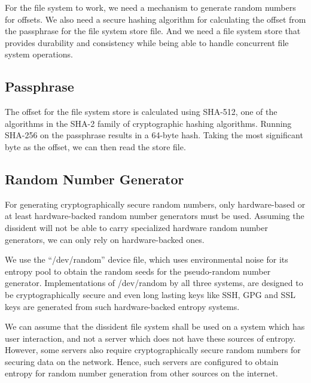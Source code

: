 \documentclass[10pt,twocolumn]{article}
\begin{document}
For the file system to work, we need a mechanism to generate random numbers for offsets. We also need a secure hashing algorithm for calculating the offset from the passphrase for the file system store file. And we need a file system store that provides durability and consistency while being able to handle concurrent file system operations.

\subsection{Passphrase}

The offset for the file system store is calculated using SHA-512, one of the algorithms in the SHA-2 family of cryptographic hashing algorithms. Running SHA-256 on the passphrase results in a 64-byte hash. Taking the most significant byte as the offset, we can then read the store file.

\subsection{Random Number Generator}

For generating cryptographically secure random numbers, only hardware-based or at least hardware-backed random number generators must be used. Assuming the dissident will not be able to carry specialized hardware random number generators, we can only rely on hardware-backed ones.

We use the ``/dev/random'' device file, which uses environmental noise for its entropy pool to obtain the random seeds for the pseudo-random number generator. Implementations of /dev/random by all three systems, are designed to be cryptographically secure and even long lasting keys like SSH, GPG and SSL keys are generated from such hardware-backed entropy systems.

We can assume that the dissident file system shall be used on a system which has user interaction, and not a server which does not have these sources of entropy. However, some servers also require cryptographically secure random numbers for securing data on the network. Hence, such servers are configured to obtain entropy for random number generation from other sources on the internet.
\end{document}
